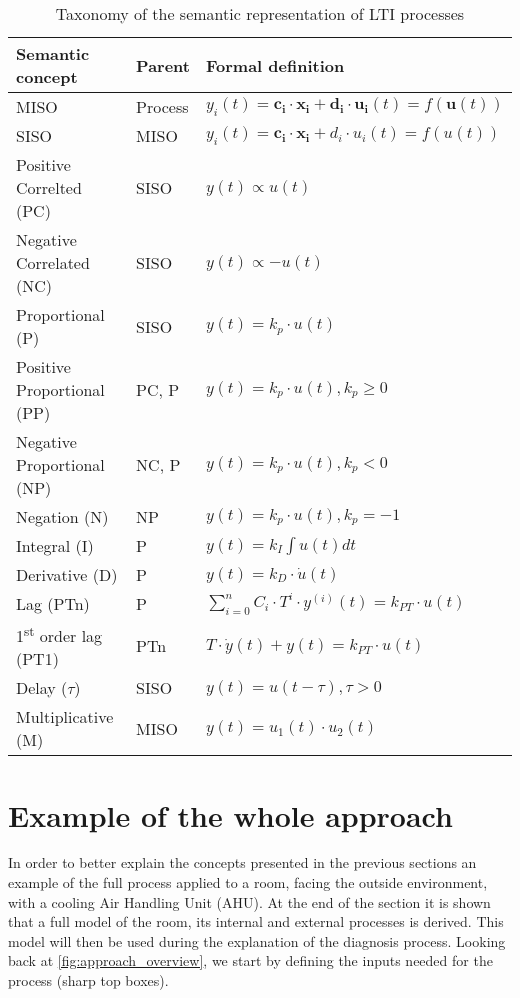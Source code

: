 \begin{table}
  \centering
  \caption{Taxonomy of the semantic representation of LTI processes}
  \label{tab:lti_taxonomy}

  \begin{tabular}{lll}\hline
    \textbf{Semantic concept} & \textbf{Parent} & \textbf{Formal definition} \\\hline
    MISO & Process & $y_i(t)=\mathbf{c_i}\cdot \mathbf{x_i}+\mathbf{d_i}\cdot \mathbf{u_i}(t)=f(\mathbf{u}(t))$ \\\hline
    SISO & MISO & $y_i(t)=\mathbf{c_i}\cdot \mathbf{x_i}+d_i\cdot u_i(t)=f(u(t))$ \\\hline
    Positive Correlted (PC) & SISO & $y(t)\propto u(t)$ \\
    Negative Correlated (NC) & SISO & $y(t)\propto -u(t)$ \\
    Proportional (P) & SISO & $y(t)=k_p\cdot u(t)$ \\
    Positive Proportional (PP) & PC, P & $y(t)=k_p\cdot u(t), k_p\geq 0$\\
    Negative Proportional (NP) & NC, P & $y(t)=k_p\cdot u(t), k_p<0$\\
    Negation (N) & NP & $y(t)=k_p\cdot u(t), k_p=-1$\\
    Integral (I) & P & $y(t)=k_I\int u(t)dt$\\
    Derivative (D) & P & $y(t)=k_D\cdot\dot u(t)$\\
    Lag (PTn) & P & $\sum_{i=0}^{n}C_i\cdot T^i \cdot y^{(i)}(t)=k_{PT}\cdot u(t) $\\
    1\textsuperscript{st} order lag (PT1) & PTn & $T\cdot\dot y(t)+y(t)=k_{PT}\cdot u(t)$\\
    Delay ($\tau$) & SISO & $y(t)=u(t-\tau), \tau>0$\\
    Multiplicative (M) & MISO & $y(t)=u_1(t)\cdot u_2(t)$
  \end{tabular}
\end{table}

\section{Example of the whole approach}
In order to better explain the concepts presented in the previous sections an example of the full process applied to a room, facing the outside environment, with a cooling Air Handling Unit (AHU). At the end of the section it is shown that a full model of the room, its internal and external processes is derived. This model will then be used during the explanation of the diagnosis process. Looking back at \autoref{fig:approach_overview}, we start by defining the inputs needed for the process (sharp top boxes).

